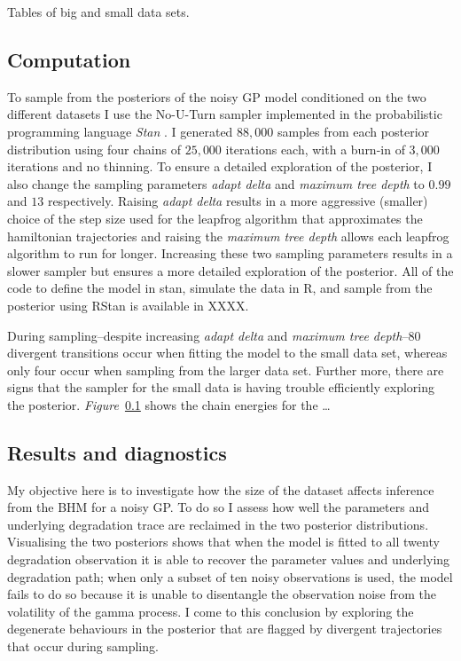Tables of big and small data sets.

\subsection{Computation}

To sample from the posteriors of the noisy GP model conditioned on the two different datasets I use the No-U-Turn sampler implemented in the probabilistic programming language \textit{Stan} \citep{Stan_2022}. I generated $88,000$ samples from each posterior distribution using four chains of $25,000$ iterations each, with a burn-in of $3,000$ iterations and no thinning. To ensure a detailed exploration of the posterior, I also change the sampling parameters \textit{adapt delta} and \textit{maximum tree depth} to $0.99$ and $13$ respectively. Raising \textit{adapt delta} results in a more aggressive (smaller) choice of the step size used for the leapfrog algorithm that approximates the hamiltonian trajectories and raising the \textit{maximum tree depth} allows each leapfrog algorithm to run for longer. Increasing these two sampling parameters results in a slower sampler but ensures a more detailed exploration of the posterior. All of the code to define the model in stan, simulate the data in R, and sample from the posterior using RStan is available in XXXX.

During sampling--despite increasing \textit{adapt delta} and \textit{maximum tree depth}--80 divergent transitions occur when fitting the model to the small data set, whereas only four occur when sampling from the larger data set. Further more, there are signs that the sampler for the small data is having trouble efficiently exploring the posterior. \textit{Figure}~\ref{} shows the chain energies for the \ldots

\subsection{Results and diagnostics} \label{sec:noisy-GP-results}

My objective here is to investigate how the size of the dataset affects inference from the BHM for a noisy GP. To do so I assess how well the parameters and underlying degradation trace are reclaimed in the two posterior distributions. Visualising the two posteriors shows that when the model is fitted to all twenty degradation observation it is able to recover the parameter values and underlying degradation path; when only a subset of ten noisy observations is used, the model fails to do so because it is unable to disentangle the observation noise from the volatility of the gamma process. I come to this conclusion by exploring the degenerate behaviours in the posterior that are flagged by divergent trajectories that occur during sampling. 

